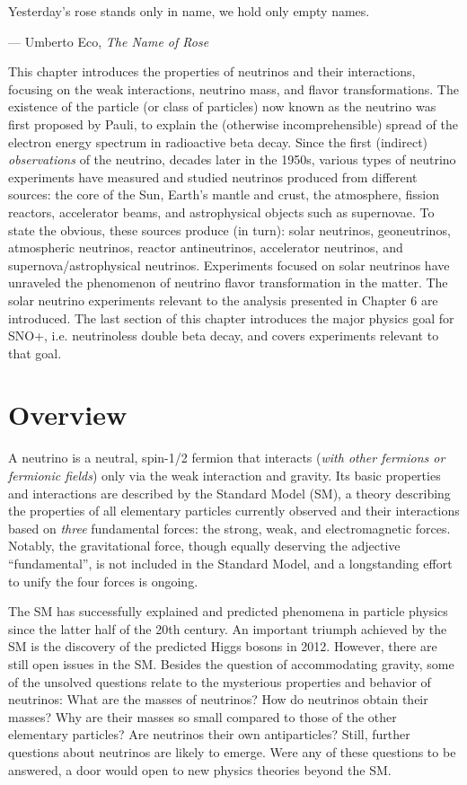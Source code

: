 \epigraph{Yesterday's rose stands only in name, we hold only empty names.}{--- \textup{Umberto Eco}, \textit{The Name of Rose}}

This chapter introduces the properties of neutrinos and their interactions, focusing on the weak interactions, neutrino mass, and flavor transformations. The existence of the particle (or class of particles) now known as the neutrino was first proposed by Pauli, to explain the (otherwise incomprehensible) spread of the electron energy spectrum in radioactive beta decay. Since the first (indirect) {\em observations} of the neutrino, decades later in the 1950s, various types of neutrino experiments have measured and studied neutrinos produced from different sources: the core of the Sun, Earth's mantle and crust, the atmosphere, fission reactors, accelerator beams, and astrophysical objects such as supernovae. To state the obvious, these sources produce (in turn): solar neutrinos, geoneutrinos, atmospheric neutrinos, reactor antineutrinos, accelerator neutrinos, and supernova/astrophysical neutrinos. Experiments focused on solar neutrinos have unraveled the phenomenon of neutrino flavor transformation in the matter. The solar neutrino experiments relevant to the analysis presented in Chapter 6 are introduced. The last section of this chapter introduces the major physics goal for SNO+, i.e. neutrinoless double beta decay, and covers experiments relevant to that goal.

\section{Overview}

A neutrino is a neutral, spin-1/2 fermion that interacts ({\em with other fermions or fermionic fields}) only via the weak interaction and gravity. Its basic properties and interactions are described by the Standard Model (SM), a theory describing the properties of all elementary particles currently observed and their interactions based on {\em three} fundamental forces: the strong, weak, and electromagnetic forces. Notably, the gravitational force, though equally deserving the adjective ``fundamental'', is not included in the Standard Model, and a longstanding effort to unify the four forces is ongoing. 

The SM has successfully explained and predicted phenomena in particle physics since the latter half of the 20th century. An important triumph achieved by the SM is the discovery of the predicted Higgs bosons in 2012. However, there are still open issues in the SM. Besides the question of accommodating gravity, some of the unsolved questions relate to the mysterious properties and behavior of neutrinos: What are the masses of neutrinos? How do neutrinos obtain their masses? Why are their masses so small compared to those of the other elementary particles? Are neutrinos their own antiparticles? Still, further questions about neutrinos are likely to emerge. Were any of these questions to be answered, a door would open to new physics theories beyond the SM.

